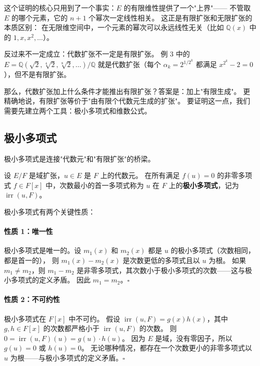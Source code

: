 这个证明的核心只用到了一个事实：$E$ 的有限维性提供了一个"上界"——
不管取 $E$ 的哪个元素，它的 $n+1$ 个幂次一定线性相关。
这正是有限扩张和无限扩张的本质区别：
在无限维空间中，一个元素的幂次可以永远线性无关（比如 $\mathbb{Q}(x)$ 中的 $1, x, x^2, \ldots$）。

反过来不一定成立：代数扩张不一定是有限扩张。
例 3 中的 $E = \mathbb{Q}(\sqrt{2}, \sqrt[4]{2}, \sqrt[8]{2}, \ldots)/\mathbb{Q}$ 就是代数扩张（每个 $\alpha_k = 2^{1/2^k}$ 都满足 $x^{2^k} - 2 = 0$），但不是有限扩张。

那么，代数扩张加上什么条件才能推出有限扩张？答案是：加上"有限生成"。
更精确地说，有限扩张等价于"由有限个代数元生成的扩张"。
要证明这一点，我们需要先建立两个工具：极小多项式和维数公式。

\subsection{极小多项式}

极小多项式是连接"代数元"和"有限扩张"的桥梁。

\begin{definition}[极小多项式]\label{def:minimal-polynomial}
设 $E/F$ 是域扩张，$u \in E$ 是 $F$ 上的代数元。
在所有满足 $f(u) = 0$ 的非零多项式 $f \in F[x]$ 中，次数最小的首一多项式称为 $u$ 在 $F$ 上的\textbf{极小多项式}，记为 $\operatorname{irr}(u, F)$。
\end{definition}

极小多项式有两个关键性质：

\paragraph*{性质 1：唯一性}
极小多项式是唯一的。设 $m_1(x)$ 和 $m_2(x)$ 都是 $u$ 的极小多项式（次数相同，都是首一的），
则 $m_1(x) - m_2(x)$ 是次数更低的多项式且以 $u$ 为根。
如果 $m_1 \neq m_2$，则 $m_1 - m_2$ 是非零多项式，其次数小于极小多项式的次数——这与极小多项式的定义矛盾。
因此 $m_1 = m_2$。$\square$

\paragraph*{性质 2：不可约性}
极小多项式在 $F[x]$ 中不可约。
假设 $\operatorname{irr}(u, F) = g(x) h(x)$，其中 $g, h \in F[x]$ 的次数都严格小于 $\operatorname{irr}(u, F)$ 的次数。
则 $0 = \operatorname{irr}(u, F)(u) = g(u) \cdot h(u)$。
因为 $E$ 是域，没有零因子，所以 $g(u) = 0$ 或 $h(u) = 0$。
无论哪种情况，都存在一个次数更小的非零多项式以 $u$ 为根——与极小多项式的定义矛盾。$\square$

